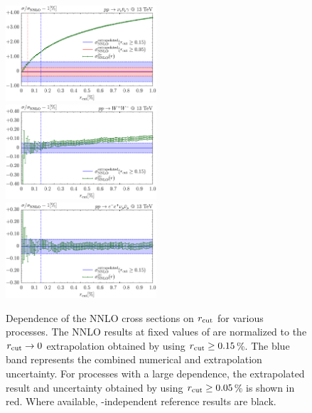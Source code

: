 \documentclass[english,11pt]{article}
\begin{document}
\begin{figure}
\begin{center}
\includegraphics[width=0.50\textwidth]{plots/rcut_plots/rcut_NNLO_ppnenexa03.pdf}\\
\includegraphics[width=0.50\textwidth]{plots/rcut_plots/rcut_NNLO_ppwxw02.pdf}\hfill
\includegraphics[width=0.50\textwidth]{plots/rcut_plots/rcut_NNLO_ppeexnmnmx04.pdf}
\vspace{-.6cm}
\caption[]{\label{fig:stability}{
Dependence of the NNLO cross sections on $r_{\mathrm{cut}}{}$ for various processes.
The NNLO results at fixed values of \rcut{} are normalized to the
$r_{\mathrm{cut}}\to 0$ extrapolation obtained
by using $r_{\mathrm{cut}}\ge 0.15$\%. The 
blue band represents the combined numerical and extrapolation uncertainty.
For processes with a large \rcut{} dependence, the extrapolated result and uncertainty 
obtained by using $r_{\mathrm{cut}}\ge 0.05$\% is shown in red. 
Where available, \rcut{}-independent reference results are black. 
}
}
\end{center}
\end{figure}
\end{document}
